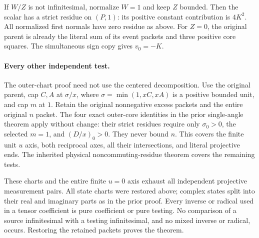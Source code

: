 If $W/Z$ is not infinitesimal, normalize $W=1$ and keep $Z$
bounded.  Then the scalar has a strict residue on $(P,1)$:
its positive constant contribution is $4K^2$.  All normalized
first normals have zero residue as above.  For $Z=0$, the original
parent is already the literal sum of its event packets and three
positive core squares.  The simultaneous sign copy gives $v_0=-K$.

\paragraph{Every other independent test.}
The outer-chart proof need not use the centered decomposition.
Use the original parent, cap $C,A$ at $\sigma/x$, where
$\sigma=\min(1,xC,xA)$ is a positive bounded unit, and cap $m$ at
$1$.  Retain the original nonnegative excess packets and the
entire original $n$ packet.  The four exact outer-core identities
in the prior single-angle theorem apply without change: their
strict residues require only $\sigma_0>0$, the selected $m=1$,
and $(D/x)_0>0$.  They never bound $n$.  This covers the finite
unit $u$ axis, both reciprocal axes, all their intersections, and
literal projective ends.  The inherited physical
noncommuting-residue theorem covers the remaining tests.

These charts and the entire finite $u=0$ axis exhaust all independent
projective measurement pairs.  All state charts were restored above;
complex states split into their real and imaginary parts as in the
prior proof.  Every inverse or radical used in a tensor coefficient
is pure coefficient or pure testing.  No comparison of a source
infinitesimal with a testing infinitesimal, and no mixed inverse
or radical, occurs.  Restoring the retained packets proves the theorem.
